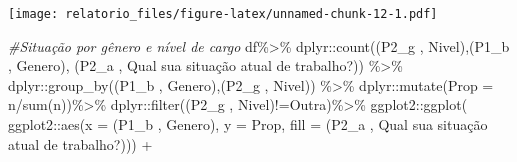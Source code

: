 \documentclass[
]{article}
\newenvironment{Shaded}{\begin{snugshade}}{\end{snugshade}}
\newcommand{\AttributeTok}[1]{\textcolor[rgb]{0.77,0.63,0.00}{#1}}
\newcommand{\CommentTok}[1]{\textcolor[rgb]{0.56,0.35,0.01}{\textit{#1}}}
\newcommand{\FunctionTok}[1]{\textcolor[rgb]{0.00,0.00,0.00}{#1}}
\newcommand{\NormalTok}[1]{#1}
\newcommand{\SpecialCharTok}[1]{\textcolor[rgb]{0.00,0.00,0.00}{#1}}
\newcommand{\StringTok}[1]{\textcolor[rgb]{0.31,0.60,0.02}{#1}}
\begin{document}
\texttt{[image: relatorio\_files/figure-latex/unnamed-chunk-12-1.pdf]}

\begin{Shaded}
\begin{Highlighting}[]
\CommentTok{\#Situação por gênero e nível de cargo}
\NormalTok{df}\SpecialCharTok{\%\textgreater{}\%}
\NormalTok{  dplyr}\SpecialCharTok{::}\FunctionTok{count}\NormalTok{(}\StringTok{\textasciigrave{}}\AttributeTok{(\textquotesingle{}P2\_g \textquotesingle{}, \textquotesingle{}Nivel\textquotesingle{})}\StringTok{\textasciigrave{}}\NormalTok{,}\StringTok{\textasciigrave{}}\AttributeTok{(\textquotesingle{}P1\_b \textquotesingle{}, \textquotesingle{}Genero\textquotesingle{})}\StringTok{\textasciigrave{}}\NormalTok{,}
               \StringTok{\textasciigrave{}}\AttributeTok{(\textquotesingle{}P2\_a \textquotesingle{}, \textquotesingle{}Qual sua situação atual de trabalho?\textquotesingle{})}\StringTok{\textasciigrave{}}\NormalTok{) }\SpecialCharTok{\%\textgreater{}\%}
\NormalTok{  dplyr}\SpecialCharTok{::}\FunctionTok{group\_by}\NormalTok{(}\StringTok{\textasciigrave{}}\AttributeTok{(\textquotesingle{}P1\_b \textquotesingle{}, \textquotesingle{}Genero\textquotesingle{})}\StringTok{\textasciigrave{}}\NormalTok{,}\StringTok{\textasciigrave{}}\AttributeTok{(\textquotesingle{}P2\_g \textquotesingle{}, \textquotesingle{}Nivel\textquotesingle{})}\StringTok{\textasciigrave{}}\NormalTok{) }\SpecialCharTok{\%\textgreater{}\%}
\NormalTok{  dplyr}\SpecialCharTok{::}\FunctionTok{mutate}\NormalTok{(}\AttributeTok{Prop =}\NormalTok{ n}\SpecialCharTok{/}\FunctionTok{sum}\NormalTok{(n))}\SpecialCharTok{\%\textgreater{}\%}
\NormalTok{  dplyr}\SpecialCharTok{::}\FunctionTok{filter}\NormalTok{(}\StringTok{\textasciigrave{}}\AttributeTok{(\textquotesingle{}P2\_g \textquotesingle{}, \textquotesingle{}Nivel\textquotesingle{})}\StringTok{\textasciigrave{}}\SpecialCharTok{!=}\StringTok{\textquotesingle{}Outra\textquotesingle{}}\NormalTok{)}\SpecialCharTok{\%\textgreater{}\%}
\NormalTok{  ggplot2}\SpecialCharTok{::}\FunctionTok{ggplot}\NormalTok{(}
\NormalTok{    ggplot2}\SpecialCharTok{::}\FunctionTok{aes}\NormalTok{(}\AttributeTok{x =} \StringTok{\textasciigrave{}}\AttributeTok{(\textquotesingle{}P1\_b \textquotesingle{}, \textquotesingle{}Genero\textquotesingle{})}\StringTok{\textasciigrave{}}\NormalTok{, }\AttributeTok{y =}\NormalTok{ Prop,}
                 \AttributeTok{fill =} \StringTok{\textasciigrave{}}\AttributeTok{(\textquotesingle{}P2\_a \textquotesingle{}, \textquotesingle{}Qual sua situação atual de trabalho?\textquotesingle{})}\StringTok{\textasciigrave{}}\NormalTok{)) }\SpecialCharTok{+}

\end{Highlighting}
\end{Shaded}
\end{document}
